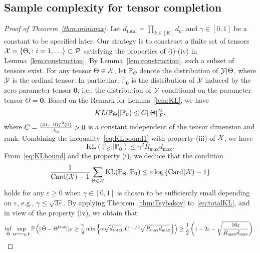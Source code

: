 \documentclass[11pt]{article}
\theoremstyle{plain}
\theoremstyle{definition}
\begin{document}
\subsection{Sample complexity for tensor completion}
\begin{proof}[Proof of Theorem~\ref{thm:minimax}]

Let $d_{\text{total}}=\prod_{k\in[K]}d_k$, and $\gamma\in[0,1]$ be a constant to be specified later.  Our strategy is to construct a finite set of tensors $\mathcal{X}=\{\Theta_i\colon i=1,\ldots \}\subset \mathcal{P}$ satisfying the properties of (i)-(iv) in Lemma~\ref{lem:construction}. By Lemma~\ref{lem:construction}, such a subset of tensors exist. For any tensor  $\Theta\in\mathcal{X}$, let $\mathbb{P}_{\Theta}$ denote the distribution of $\mathcal{Y}|\Theta$, where $\mathcal{Y}$ is the ordinal tensor. In particular, $\mathbb{P}_{\mathbf{0}}$ is the distribution of $\mathcal{Y}$ induced by the zero parameter tensor $\mathbf{0}$, i.e., the distribution of $\mathcal{Y}$ conditional on the parameter tensor $\Theta=\mathbf{0}$. Based on the Remark for Lemma~\ref{lem:KL}, we have
\begin{equation}\label{eq:KLbound1}
KL(\mathbb{P}_{\Theta}|| \mathbb{P}_{\mathbf{0}})\leq C \lVert\Theta\rVert_F^2,
\end{equation}
where $C={(4L-6) \dot{f}^2(0)\over  A_\alpha}>0$ is a constant independent of the tensor dimension and rank. 
Combining the inequality~\eqref{eq:KLbound1} with property (iii) of $\mathcal{X}$, we have
\begin{equation}\label{eq:KLbound}
\text{KL}(\mathbb{P}_{\Theta}||\mathbb{P}_{\mathbf{0}})\leq \gamma^2 R_{\max} d_{\max}.
\end{equation}
From~\eqref{eq:KLbound} and the property (i), we deduce that the condition 
\begin{equation}\label{eq:totalKL}
{1\over \text{Card}(\mathcal{X})-1}\sum_{\Theta \in\mathcal{X}}\text{KL}(\mathbb{P}_{\Theta}, \mathbb{P}_{\mathbf{0}})\leq \varepsilon \log\left\{\text{Card}(\mathcal{X})-1 \right\}
\end{equation}
holds for any $ \varepsilon \geq 0$ when $\gamma\in[0,1]$ is chosen to be sufficiently small depending on $\varepsilon$, e.g., $\gamma \leq \sqrt{3\varepsilon}$. By applying Theorem~\ref{thm:Tsybakov} to~\eqref{eq:totalKL}, and in view of the property (iv), we obtain that 
\begin{equation}\label{eq:final}
\inf_{\hat \Theta}\sup_{\trueT\in \tX}\mathbb{P}\left(\FnormSize{}{\hat \Theta- \trueT}\geq  {\gamma\over 8} \min\left\{ \alpha\sqrt{d_{\text{total}}}, C^{-1/2}\sqrt{ R_{\max}d_{\max}}\right\} \right)\geq {1\over 2}\left(1-2\varepsilon-\sqrt{16 \varepsilon \over R_{\max}d_{\max}}\right).

\end{equation}
\end{proof}
\end{document}
